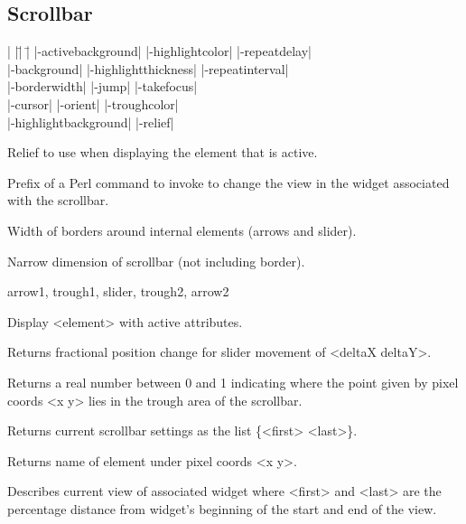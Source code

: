 \subsection*{Scrollbar}
\vspace{-4pt}

\begin{tabbing}
|                   |\=|                     |\= \kill
|-activebackground| \> |-highlightcolor|     \> |-repeatdelay| \\   
|-background|       \> |-highlightthickness| \> |-repeatinterval| \\
|-borderwidth|      \> |-jump| 		     \> |-takefocus| \\
|-cursor|           \> |-orient|             \> |-troughcolor| \\   
|-highlightbackground| \> |-relief| \\   
\end{tabbing}

\vskip5pt
\begin{enum}{1cm}

Relief to use when displaying the element that is active.

Prefix of a Perl command to invoke to change the view in
the widget associated with the scrollbar.

Width of borders around internal elements (arrows and slider).
 
Narrow dimension of scrollbar (not including border).

\end{enum}
\begin{enum}{2cm}
 arrow1, trough1, slider, trough2, arrow2
\end{enum}
\vskip5pt
\begin{enum}{1cm}

Display <element> with active attributes.

Returns fractional position change for slider movement of <deltaX deltaY>.

Returns a real number between 0 and 1 indicating where the point given
by pixel coords <x y> lies in the trough area of the scrollbar.

Returns current scrollbar settings as the list \{<first> <last>\}.

Returns name of element under pixel coords <x y>.

Describes current view of associated widget where <first> and <last> are the
percentage distance from widget's beginning of the start and end of
the view.

\end{enum}


